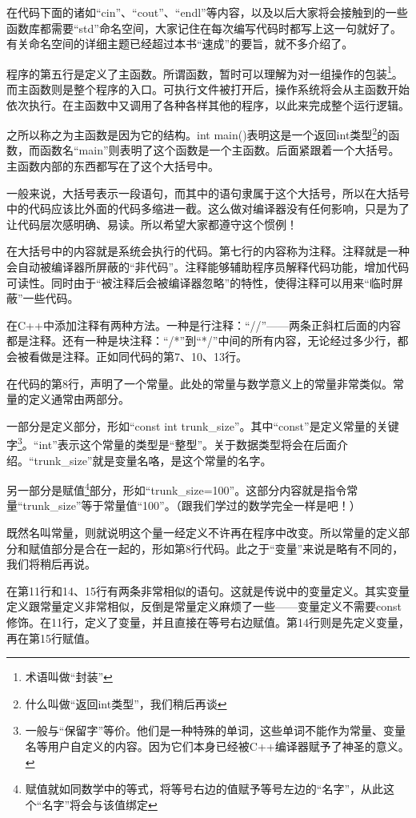 在代码下面的诸如“cin”、“cout”、“endl”等内容，以及以后大家将会接触到的一些函数库都需要“std”命名空间，大家记住在每次编写代码时都写上这一句就好了。有关命名空间的详细主题已经超过本书“速成”的要旨，就不多介绍了。

程序的第五行是定义了主函数。所谓函数，暂时可以理解为对一组操作的包装\footnote{术语叫做“封装”}。而主函数则是整个程序的入口。可执行文件被打开后，操作系统将会从主函数开始依次执行。在主函数中又调用了各种各样其他的程序，以此来完成整个运行逻辑。

之所以称之为主函数是因为它的结构。int main()表明这是一个返回int类型\footnote{什么叫做“返回int类型”，我们稍后再谈}的函数，而函数名“main”则表明了这个函数是一个主函数。后面紧跟着一个大括号。主函数内部的东西都写在了这个大括号中。

一般来说，大括号表示一段语句，而其中的语句隶属于这个大括号，所以在大括号中的代码应该比外面的代码多缩进一截。这么做对编译器没有任何影响，只是为了让代码层次感明确、易读。所以希望大家都遵守这个惯例！

在大括号中的内容就是系统会执行的代码。第七行的内容称为注释。注释就是一种会自动被编译器所屏蔽的“非代码”。注释能够辅助程序员解释代码功能，增加代码可读性。同时由于“被注释后会被编译器忽略”的特性，使得注释可以用来“临时屏蔽”一些代码。

在C++中添加注释有两种方法。一种是行注释：“//”——两条正斜杠后面的内容都是注释。还有一种是块注释：“/*”到“*/”中间的所有内容，无论经过多少行，都会被看做是注释。正如同代码的第7、10、13行。

在代码的第8行，声明了一个常量。此处的常量与数学意义上的常量非常类似。常量的定义通常由两部分。

一部分是定义部分，形如“const int trunk\_size”。其中“const”是定义常量的关键字\footnote{一般与“保留字”等价。他们是一种特殊的单词，这些单词不能作为常量、变量名等用户自定义的内容。因为它们本身已经被C++编译器赋予了神圣的意义。}。“int”表示这个常量的类型是“整型”。关于数据类型将会在后面介绍。“trunk\_size”就是变量名咯，是这个常量的名字。

另一部分是赋值\footnote{赋值就如同数学中的等式，将等号右边的值赋予等号左边的“名字”，从此这个“名字”将会与该值绑定}部分，形如“trunk\_size=100”。这部分内容就是指令常量“trunk\_size”等于常量值“100”。（跟我们学过的数学完全一样是吧！）

既然名叫常量，则就说明这个量一经定义不许再在程序中改变。所以常量的定义部分和赋值部分是合在一起的，形如第8行代码。此之于“变量”来说是略有不同的，我们将稍后再说。

在第11行和14、15行有两条非常相似的语句。这就是传说中的变量定义。其实变量定义跟常量定义非常相似，反倒是常量定义麻烦了一些——变量定义不需要const修饰。在11行，定义了变量，并且直接在等号右边赋值。第14行则是先定义变量，再在第15行赋值。


